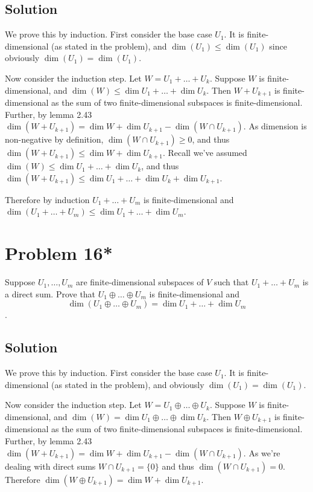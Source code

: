 \documentclass{article}
\begin{document}
\subsection*{Solution}
We prove this by induction. First consider the base case $U_1$. It is finite-dimensional (as stated in the problem), and $\dim(U_1)\leq\dim(U_1)$ since obviously $\dim(U_1)=\dim(U_1)$.

\vs

Now consider the induction step. Let $W=U_1+\ldots+U_{k}$. Suppose $W$ is finite-dimensional, and $\dim(W)\leq\dim U_1+\ldots+\dim U_k$. Then $W+U_{k+1}$ is finite-dimensional as the sum of two finite-dimensional subspaces is finite-dimensional. Further, by lemma 2.43 $\dim(W+U_{k+1})=\dim W+\dim U_{k+1}-\dim(W\cap U_{k+1})$. As dimension is non-negative by definition, $\dim(W\cap U_{k+1})\geq 0$, and thus $\dim(W+U_{k+1})\leq\dim W+\dim U_{k+1}$. Recall we've assumed $\dim(W)\leq\dim U_1+\ldots+\dim U_k$, and thus $\dim(W+U_{k+1})\leq\dim U_1+\ldots+\dim U_k+\dim U_{k+1}$.

\vs

Therefore by induction $U_1+\ldots+U_m$ is finite-dimensional and
$\dim(U_1+\ldots+U_m)\leq\dim U_1+\ldots+\dim U_m$.

\section*{Problem 16*}
Suppose $U_1,\ldots,U_m$ are finite-dimensional subspaces of $V$ such that $U_1+\ldots+U_m$ is a direct sum. Prove that $U_1\oplus\ldots\oplus U_m$ is finite-dimensional and
\[\dim(U_1\oplus\ldots\oplus U_m)=\dim U_1+\ldots+\dim U_m\].

\subsection*{Solution}
We prove this by induction. First consider the base case $U_1$. It is finite-dimensional (as stated in the problem), and obviously $\dim(U_1)=\dim(U_1)$.

\vs

Now consider the induction step. Let $W=U_1\oplus\ldots\oplus U_{k}$. Suppose $W$ is finite-dimensional, and $\dim(W)=\dim U_1\oplus\ldots\oplus\dim U_k$. Then $W\oplus U_{k+1}$ is finite-dimensional as the sum of two finite-dimensional subspaces is finite-dimensional. Further, by lemma 2.43 $\dim(W+U_{k+1})=\dim W+\dim U_{k+1}-\dim(W\cap U_{k+1})$. As we're dealing with direct sums $W\cap U_{k+1}=\{0\}$ and thus $\dim(W\cap U_{k+1})=0$. Therefore $\dim(W\oplus U_{k+1})=\dim W+\dim U_{k+1}$.
\end{document}
